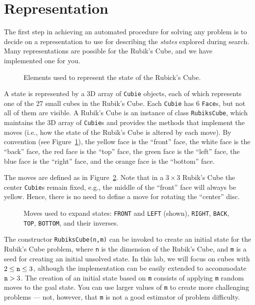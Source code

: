 \documentclass[a4paper]{article}
\begin{document}
\section{Representation}
The first step in achieving an automated procedure for solving any problem is to decide on a representation to use for describing the {\em states} explored during search.  Many representations are possible for the Rubik's Cube, and we have implemented one for you.

\begin{figure}[!ht]
\centering

\caption{{\small Elements used to represent the state of the Rubick's Cube.}}
\label{fig:rcState}
\end{figure}

A state is represented by a 3D array of {\tt Cubie} objects, each of which represents one of the 27 small cubes in the Rubik's Cube.  Each {\tt Cubie} has 6 {\tt Face}s, but not all of them are visible.  A Rubik's Cube is an instance of class {\tt RubiksCube}, which maintains the 3D array of {\tt Cubie}s and provides the methods that implement the moves (i.e., how the state of the Rubik's Cube is altered by each move).  By convention (see Figure~\ref{fig:rcState}), the yellow face is the ``front'' face, the white face is the ``back'' face, the red face is the ``top'' face, the green face is the ``left'' face, the blue face is the ``right'' face, and the orange face is the ``bottom'' face.  

The moves are defined as in Figure~\ref{fig:rcMoves}.  Note that in a $3 \times 3$ Rubik's Cube the center {\tt Cubie}s remain fixed, e.g., the middle of the ``front'' face will always be yellow.  Hence, there is no need to define a move for rotating the ``center'' disc.

\begin{figure}[!ht]
\centering

\caption{{\small Moves used to expand states: {\tt FRONT} and {\tt LEFT} (shown), {\tt RIGHT}, {\tt BACK}, {\tt TOP}, {\tt BOTTOM}, and their inverses.}}
\label{fig:rcMoves}
\end{figure}

The constructor {\tt RubiksCube(n,m)} can be invoked to create an initial state for the Rubik's Cube problem, where {\tt n} is the dimension of the Rubik's Cube, and {\tt m} is a seed for creating an initial unsolved state.  In this lab, we will focus on cubes with $2 \leq \text{{\tt n}} \leq 3$, although the implementation can be easily extended to accommodate $\text{{\tt n}} > 3$.  The creation of an initial state based on {\tt m} consists of applying {\tt m} random moves to the goal state.  You can use larger values of {\tt m} to create more challenging problems --- not, however, that {\tt m} is not a good estimator of problem difficulty.
\end{document}
